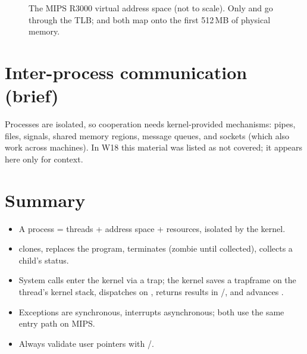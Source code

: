 \begin{figure}[H]
\centering
{}
\caption{The MIPS R3000 virtual address space (not to scale). Only
 and  go through the TLB;  and
 both map onto the first 512\,MB of physical memory.}
\end{figure}

\section{Inter-process communication (brief)}
Processes are isolated, so cooperation needs kernel-provided mechanisms: pipes, files, signals,
shared memory regions, message queues, and sockets (which also work across machines). In W18 this
material was listed as not covered; it appears here only for context.

\section*{Summary}
\begin{itemize}
  \item A process = threads + address space + resources, isolated by the kernel.
  \item {} clones,  replaces the program,  terminates (zombie
    until collected),  collects a child's status.
  \item System calls enter the kernel via a trap; the kernel saves a trapframe on the thread's
    kernel stack, dispatches on , returns results in /, and advances
    .
  \item Exceptions are synchronous, interrupts asynchronous; both use the same entry path on
    MIPS.
  \item Always validate user pointers with /.
\end{itemize}
